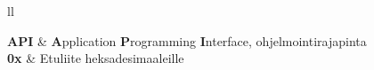\documentclass[
11pt, %
english,
singlespacing, %
parskip, %
nohyperref, %
headsepline, %
]{class} %
\begin{document}
\renewcommand{\contentsname}{Sisällysluettelo}
\tableofcontents %



\begin{abbreviations}{ll} %

\textbf{API} & \textbf{A}pplication \textbf{P}rogramming \textbf{I}nterface, ohjelmointirajapinta\\
\textbf{0x} & Etuliite heksadesimaaleille\\

\end{abbreviations}



\mainmatter %

\pagestyle{thesis} %









\begin{appendices}
\renewcommand\appendixname{Liite}
\appendix %




\end{appendices}

\nocite{*}
\printbibliography[title={Kirjallisuus ja lähteet}, heading=bibintoc]

\end{document}

